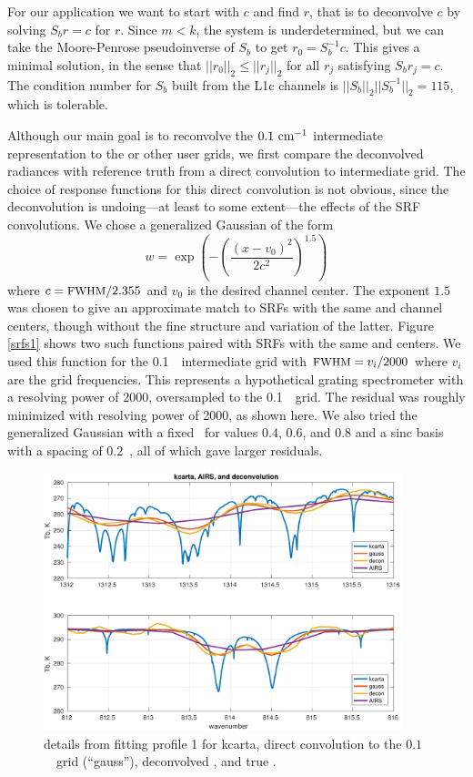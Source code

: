 \documentclass[11pt]{article}
\begin{document}
For our application we want to start with $c$ and find $r$, that is
to deconvolve $c$ by solving $S_b r = c$ for $r$.  Since $m < k$,
the system is underdetermined, but we can take the Moore-Penrose
pseudoinverse \cite{pinv} of $S_b$ to get $r_0 = S_b^{-1} c$.  This
gives a minimal solution, in the sense that $||r_0||_2 \le
||r_j||_2$ for all $r_j$ satisfying $S_b r_j = c$.  The condition
number for $S_b$ built from the L1c channels is
$||S_b||_2||S_b^{-1}||_2 = 115$, which is tolerable.

Although our main goal is to reconvolve the $0.1~\mbox{cm$^{-1}$}$ intermediate
representation to the {\cris} or other user grids, we first compare
the deconvolved radiances with reference truth from a direct
convolution to intermediate grid.  The choice of response functions
for this direct convolution is not obvious, since the deconvolution
is undoing---at least to some extent---the effects of the {\airs}
SRF convolutions.  We chose a generalized Gaussian of the form
\[w = \exp\left(-\left(\frac{(x - v_0)^2}{2c^2}\right)^{1.5}\right) \]
where $c=\mbox{\small FWHM} / 2.355$ and $v_0$ is the desired channel center.
The exponent $1.5$ was chosen to give an approximate match to
{\airs} SRFs with the same {\fwhm} and channel centers, though
without the fine structure and variation of the latter.  Figure
\ref{srfs1} shows two such functions paired with {\airs} SRFs with
the same {\fwhm} and centers.  We used this function for the
0.1~\wn\ intermediate grid with ${\mbox{\small FWHM}} = v_i / 2000$ where $v_i$
are the grid frequencies.  This represents a hypothetical grating
spectrometer with a resolving power of 2000, oversampled to the
0.1~\wn\ grid.  The residual was roughly minimized with resolving
power of 2000, as shown here.  We also tried the generalized
Gaussian with a fixed \fwhm\ for values $0.4$, $0.6$, and $0.8$ and
a sinc basis with a spacing of $0.2$~\wn, all of which gave larger
residuals.

\begin{figure} %
  \centering
  \includegraphics[height=7.5cm]{figures/airs_decon_zoom.pdf}
  \caption{details from fitting profile 1 for kcarta, direct
    convolution to the $0.1$~\wn\ grid (``gauss''), deconvolved
    {\airs}, and true {\airs}.}
  \label{dzoom}
\end{figure}
\end{document}
